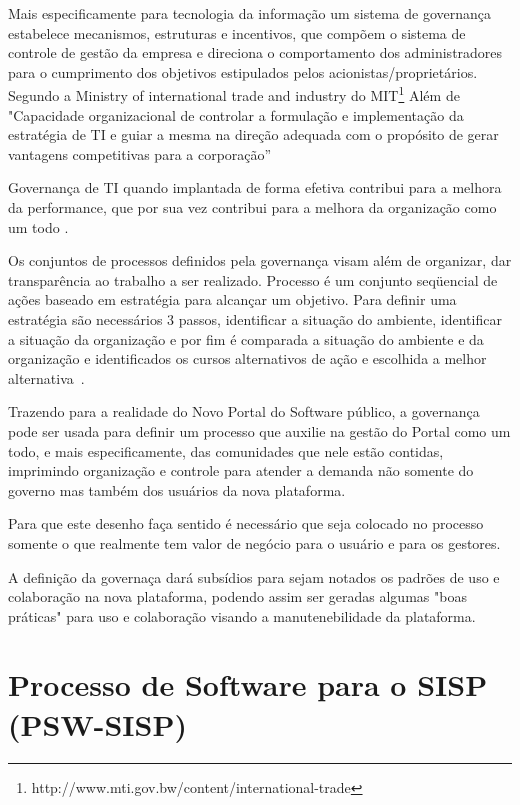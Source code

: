 Mais especificamente para tecnologia da informação um sistema de governança
estabelece mecanismos, estruturas e incentivos, que compõem o sistema de controle de 
gestão da empresa e direciona o comportamento dos administradores para o cumprimento 
dos objetivos estipulados pelos acionistas/proprietários\cite{martin2004governancca}.
%
Segundo a Ministry of international trade and industry do MIT\footnote{http://www.mti.gov.bw/content/international-trade} 
Além de "Capacidade organizacional de controlar a formulação e implementação da 
estratégia de TI e guiar a mesma na direção adequada com o propósito de gerar 
vantagens competitivas para a corporação”

Governança de TI quando implantada de forma efetiva contribui para a melhora da 
performance, que por sua vez contribui para a melhora da organização como um todo
\cite{tres2014information}.

Os conjuntos de processos definidos pela governança visam além de organizar, 
dar transparência ao trabalho a ser realizado.
%
Processo é um conjunto seqüencial de ações baseado em estratégia para alcançar
um objetivo. Para definir uma estratégia são necessários 3 passos, identificar a
situação do ambiente, identificar a situação da organização e por fim é comparada
a situação do ambiente e da organização e identificados os cursos alternativos
de ação e escolhida a melhor alternativa~\cite{molinarogestao}.

Trazendo para a realidade do Novo Portal do Software público, a governança pode ser usada para 
definir um processo que auxilie na gestão do Portal como um todo, e mais especificamente,
das comunidades que nele estão contidas, imprimindo organização e controle para atender 
a demanda não somente do governo mas também dos usuários da nova plataforma.

Para que este desenho faça sentido é necessário que seja colocado no processo somente o que 
realmente tem valor de negócio para o usuário e para os gestores.

A definição da governaça dará subsídios para sejam notados os padrões de uso e colaboração na
nova plataforma, podendo assim ser geradas algumas "boas práticas" para uso e colaboração
visando a manutenebilidade da plataforma.

\section{Processo de Software para o SISP (PSW-SISP)}

